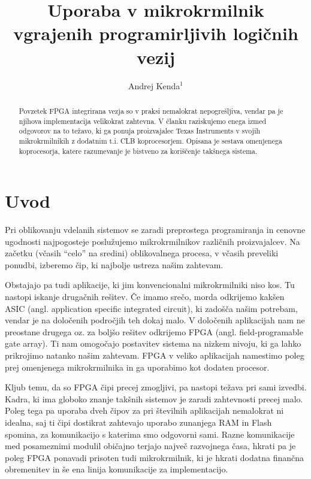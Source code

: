 \documentclass[a4paper]{article}
\begin{document}
\begin{sloppypar}
\title{Uporaba v mikrokrmilnik vgrajenih programirljivih logičnih vezij}

\author{Andrej Kenda$^{1}$}



\maketitle



\begin{abstract}{Povzetek}
FPGA integrirana vezja so v praksi nemalokrat nepogrešljiva, vendar pa je
njihova implementacija velikokrat zahtevna. V članku raziskujemo enega izmed
odgovorov na to težavo, ki ga ponuja proizvajalec Texas Instruments v svojih
mikrokrmilnikih z dodatnim t.i. CLB koprocesorjem. Opisana je sestava
omenjenega koprocesorja, katere razumevanje je bistveno za koriščenje takšnega
sistema.
\end{abstract}




\section{Uvod}
Pri oblikovanju vdelanih sistemov se zaradi preprostega programiranja in
cenovne ugodnosti najpogosteje poslužujemo mikrokrmilnikov različnih
proizvajalcev. Na začetku (včasih ``celo'' na sredini) oblikovalnega procesa, v
včasih preveliki ponudbi, izberemo čip, ki najbolje ustreza našim zahtevam.

Obstajajo pa tudi aplikacije, ki jim konvencionalni mikrokrmilniki niso kos. Tu
nastopi iskanje drugačnih rešitev. Če imamo srečo, morda odkrijemo kakšen ASIC
(angl. application specific integrated circuit), ki zadošča našim potrebam,
vendar je na določenih področjih teh dokaj malo. V določenih aplikacijah nam ne
preostane drugega oz. za boljšo rešitev odkrijemo FPGA (angl. field-programable
gate array). Ti nam omogočajo postavitev sistema na nizkem nivoju, ki ga lahko
prikrojimo natanko našim zahtevam. FPGA v veliko aplikacijah namestimo poleg
prej omenjenega mikrokrmilnika in ga uporabimo kot dodaten procesor.

Kljub temu, da so FPGA čipi precej zmogljivi, pa nastopi težava pri sami
izvedbi. Kadra, ki ima globoko znanje takšnih sistemov je zaradi zahtevnosti
precej malo. Poleg tega pa uporaba dveh čipov za pri številnih aplikacijah
nemalokrat ni idealna, saj ti čipi dostikrat zahtevajo uporabo zunanjega RAM in
Flash spomina, za komunikacijo s katerima smo odgovorni sami. Razne
komunikacije med posameznimi modulil običajno terjajo največ razvojnega časa,
hkrati pa je poleg FPGA ponavadi prisoten tudi mikrokrmilnik, ki je hkrati
dodatna finančna obremenitev in še ena linija komunikacije za implementacijo.


\end{sloppypar}
\end{document}
